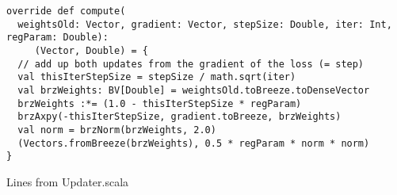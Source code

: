 \begin{listing}[H]
\begin{verbatim}
override def compute(
  weightsOld: Vector, gradient: Vector, stepSize: Double, iter: Int, regParam: Double):
     (Vector, Double) = {
  // add up both updates from the gradient of the loss (= step) 
  val thisIterStepSize = stepSize / math.sqrt(iter)
  val brzWeights: BV[Double] = weightsOld.toBreeze.toDenseVector
  brzWeights :*= (1.0 - thisIterStepSize * regParam)
  brzAxpy(-thisIterStepSize, gradient.toBreeze, brzWeights)
  val norm = brzNorm(brzWeights, 2.0)
  (Vectors.fromBreeze(brzWeights), 0.5 * regParam * norm * norm)
}
\end{verbatim}
\caption{Lines from Updater.scala}
\label{lst:updatercal}
\end{listing}

